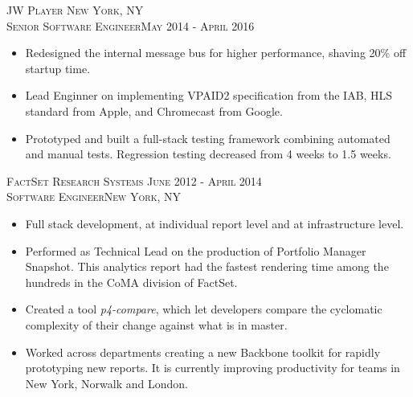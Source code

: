 \documentclass[oneside, final]{scrartcl}
\begin{document}
\begin{center}
\textsc{JW Player \hfill New York, NY\\}
\textsc{Senior Software Engineer\hfill May 2014 - April 2016\\}
\begin{itemize}
    \vspace{-8pt}
	\setlength{\itemsep}{1pt}
	\setlength{\itemsep}{1pt}
	\setlength{\parskip}{0pt}
	\setlength{\parsep}{0pt}
	\setlength{\leftmargin}{-5mm}
	\item Redesigned the internal message bus for higher performance, shaving 20\% off startup time.
	\item Lead Enginner on implementing VPAID2 specification from the IAB, HLS standard from Apple, and Chromecast from Google.
	\item Prototyped and built a full-stack testing framework combining automated and manual tests. Regression testing decreased from 4 weeks to 1.5 weeks.
\end{itemize}

\textsc{FactSet Research Systems \hfill June 2012 - April 2014\\}
\textsc{Software Engineer\hfill New York, NY\\}
\begin{itemize}
    \vspace{-8pt}
	\setlength{\itemsep}{1pt}
	\setlength{\parskip}{0pt}
	\setlength{\parsep}{0pt}
	\setlength{\leftmargin}{-5mm}
	\item Full stack development, at individual report level and at infrastructure level.
	\item Performed as Technical Lead on the production of Portfolio Manager Snapshot. This analytics report had the fastest rendering time among the hundreds in the CoMA division of FactSet.
	\item Created a tool \textit{p4-compare}, which let developers compare the cyclomatic complexity of their change against what is in master.
	\item Worked across departments creating a new Backbone toolkit for rapidly prototyping new reports. It is currently improving productivity for teams in New York, Norwalk and London.
\end{itemize}


\end{center}
\end{document}
